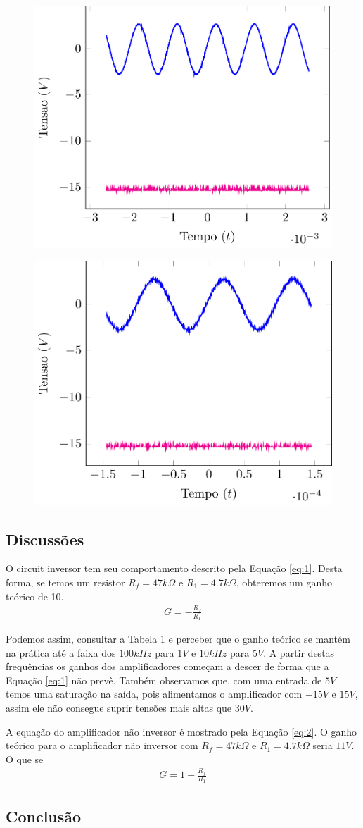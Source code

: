 \documentclass[12pt,a4paper]{article}
\begin{document}
\begin{figure}[htpb]
  \centering
  \includegraphics[width=0.8\linewidth]{./img/4V_1K.pdf}
  \label{4V1K}
\end{figure}
\begin{figure}[htpb]
  \centering
  \includegraphics[width=0.8\linewidth]{./img/4V_100K.pdf}
  \label{4V100K}
\end{figure}
\subsection{Discussões}
O circuit inversor tem seu comportamento descrito pela Equação \ref{eq:1}. Desta forma, se temos um resistor $R_f =47 k\Omega$ e $R_1 = 4.7 k\Omega$, obteremos um ganho teórico de 10.
\begin{align}
  \label{eq:1}
G= - \frac{R_f}{R_1} 
\end{align}

Podemos assim, consultar a Tabela 1 e perceber que o ganho teórico se mantém na prática até a faixa dos $100 kHz$ para $1V$ e $10 kHz$ para $5V$. A partir destas frequências os ganhos dos amplificadores começam a descer de forma que a Equação \ref{eq:1} não prevê. Também observamos que, com uma entrada de $5V$ temos uma saturação na saída, pois alimentamos o amplificador com $-15V$ e $15V$, assim ele não consegue suprir tensões mais altas que $30V$.

A equação do amplificador não inversor é mostrado pela Equação \ref{eq:2}. O ganho teórico para o amplificador não inversor com $R_f = 47 k\Omega$ e $R_1=4.7 k\Omega$ seria $11V$. O que se 
\begin{align}
  G = 1 + \frac{R_f}{R_1} 
\end{align}
\subsection{Conclusão}
\end{document}
